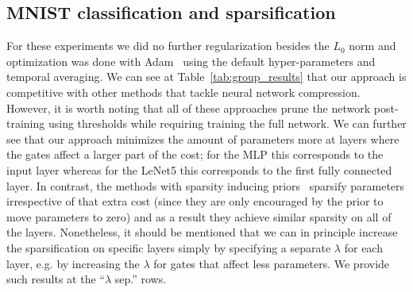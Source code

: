 \documentclass{article} %
\begin{document}
\subsection{MNIST classification and sparsification}
For these experiments we did no further regularization besides the $L_0$ norm and optimization was done with Adam~\citep{kingma2014adam} using the default hyper-parameters and temporal averaging. We can see at Table~\ref{tab:group_results} that our approach is competitive with other methods that tackle neural network compression. However, it is worth noting that all of these approaches prune the network post-training using thresholds while requiring training the full network. We can further see that our approach minimizes the amount of parameters more at layers where the gates affect a larger part of the cost; for the MLP this corresponds to the input layer whereas for the LeNet5 this corresponds to the first fully connected layer. In contrast, the methods with sparsity inducing priors~\citep{louizos2017bayesian,neklyudov2017structured} sparsify parameters irrespective of that extra cost (since they are only encouraged by the prior to move parameters to zero) and as a result they achieve similar sparsity on all of the layers. Nonetheless, it should be mentioned that we can in principle increase the sparsification on specific layers simply by specifying a separate $\lambda$ for each layer, e.g. by increasing the $\lambda$ for gates that affect less parameters. We provide such results at the ``$\lambda$ sep.'' rows.
\end{document}
